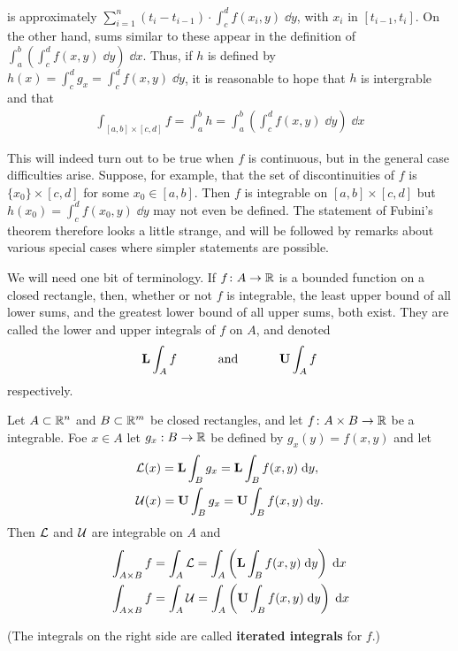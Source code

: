 is approximately $\sum_{i=1}^{n }{(t_i-t_{i-1}) \cdot \int_c^d f(x_i,y)\;\dd y} $, with $x_i$ in 
$[t_{i-1},t_i]$. On the other hand, sums similar to these appear in the definition of 
$\int_a^b\left(\int_c^d f(x, y)\;\dd y\right)\;\dd x$. Thus, if $h$ is defined by 
$h(x) = \int_c^d g_x = \int_c^d f(x, y)\;\dd y$, it is reasonable to hope that $h$ is 
intergrable and that 
\begin{align*}
    \int_{[a,b]\times [c, d]} f  
    = \int_a^b h
    = \int_a^b\left(\int_c^d f(x, y)\;\dd y\right)\;\dd x
\end{align*}

This will indeed turn out to be true when $f$ is continuous, but in the general case difficulties arise.
Suppose, for example, that the set of discontinuities of $f$ is $\{x_0 \} \times [c,d]$ for some
$x_0 \in [a,b]$. Then $f$ is integrable on $[a,b] \times [c,d]$ but $h(x_0) =\int_c^d f(x_0,y)\;\dd y$ 
may not even be defined. The statement of Fubini's theorem therefore looks a little strange, and will be
followed by remarks about various special cases where simpler statements are possible.

We will need one bit of terminology. If $f\colon{} A\to  \mathbb{R}$ is a
bounded function on a closed rectangle, then, whether or not
$f$ is integrable, the least upper bound of all lower sums, and
the greatest lower bound of all upper sums, both exist.
They are called the lower and upper integrals of $f$ on $A$, and
denoted 
\begin{align*}
  \mathbf{L} \int_A f \text{\hspace*{3em} and \hspace*{3em}} \mathbf U\int_A f
\end{align*}
respectively. 

\begin{theorem}
    Let $A\subset \mathbb{R}^n$ and $B\subset \mathbb{R}^m$ be closed rectangles, and 
    let $f\colon{} A\times B\to \mathbb{R}$ be a integrable. Foe $x\in A$ let $g_x:B\to \mathbb{R}$ be defined 
    by $g_x(y)=f(x, y)$ and let 
    \begin{align*}
        & \mathcal{L}(x) = \mathbf{L}\int_B g_x = \mathbf{L}\int_B f(x, y)\;\mathrm{d} y, \\
        & \mathcal{U}(x) = \mathbf{U}\int_B g_x = \mathbf{U}\int_B f(x, y)\;\mathrm{d} y.
    \end{align*}
    Then $\mathcal{L}$ and $\mathcal{U}$ are integrable on $A$ and 
    \begin{align*}
        & \int_{A\times B} f = \int_A \mathcal{L} = \int_A \left(\mathbf{L}\int_B f(x, y)\;\mathrm{d} y\right)\;\mathrm{d} x \\
        & \int_{A\times B} f = \int_A \mathcal{U} = \int_A \left(\mathbf{U}\int_B f(x, y)\;\mathrm{d} y\right)\;\mathrm{d} x
    \end{align*}
\end{theorem}
\noindent(The integrals on the right side are called \textbf{iterated integrals} for $f$.)

